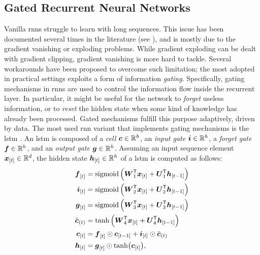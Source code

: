 \subsection{Gated Recurrent Neural Networks}
Vanilla \glspl{rnn} struggle to learn with long sequences. This issue has been documented several times in the literature (see \eg \citep{bengio1994learninglongtermdependenciesdifficult}), and is mostly due to the gradient vanishing or exploding problems. While gradient exploding can be dealt with gradient clipping, gradient vanishing is more hard to tackle. Several workarounds have been proposed to overcome such limitation; the most adopted in practical settings exploits a form of information \emph{gating}. Specifically, gating mechanisms in \glspl{rnn} are used to control the information flow inside the recurrent layer. In particular, it might be useful for the network to \emph{forget} useless information, or to \emph{reset} the hidden state when some kind of knowledge has already been processed. Gated mechanisms fulfill this purpose adaptively, driven by data. The most used \gls{rnn} variant that implements gating mechanisms is the \gls{lstm} \citep{hochreiter1997lstm}.
An \gls{lstm} is composed of a \emph{cell} $\Vector{c} \in \Real^h$, an \emph{input gate} $\Vector{i} \in \Real^h$, a \emph{forget gate} $\Vector{f} \in \Real^h$, and an \emph{output gate} $\Vector{g} \in \Real^h$. Assuming an input sequence element $\Elem{x}{t} \in \Real^d$, the hidden state $\Elem{h}{t} \in \Real^h$ of a \gls{lstm} is computed as follows:
\begin{align*}
    \Elem{f}{t} &= \sigmoid\Par{\Matrix{W}_{1}^{\Transpose}\Elem{x}{t} + \Matrix{U}_{1}^{\Transpose}\Elem{h}{t-1}}\\
    \Elem{i}{t} &= \sigmoid\Par{\Matrix{W}_{2}^{\Transpose}\Elem{x}{t} + \Matrix{U}_{2}^{\Transpose}\Elem{h}{t-1}}\\
    \Elem{g}{t} &= \sigmoid\Par{\Matrix{W}_{3}^{\Transpose}\Elem{x}{t} + \Matrix{U}_{3}^{\Transpose}\Elem{h}{t-1}}\\
    \tilde{\Vector{c}}_{(t)} &= \tanh\Par{\Matrix{W}_{4}^{\Transpose}\Elem{x}{t} + \Matrix{U}_{4}^{\Transpose}\Elem{h}{t-1}}\\
    \Elem{c}{t} &= \Elem{f}{t} \odot \Elem{c}{t-1} + \Elem{i}{t} \odot \tilde{\Vector{c}}_{(t)}\\
    \Elem{h}{t} &= \Elem{g}{t} \odot \tanh(\Elem{c}{t}),
\end{align*}
